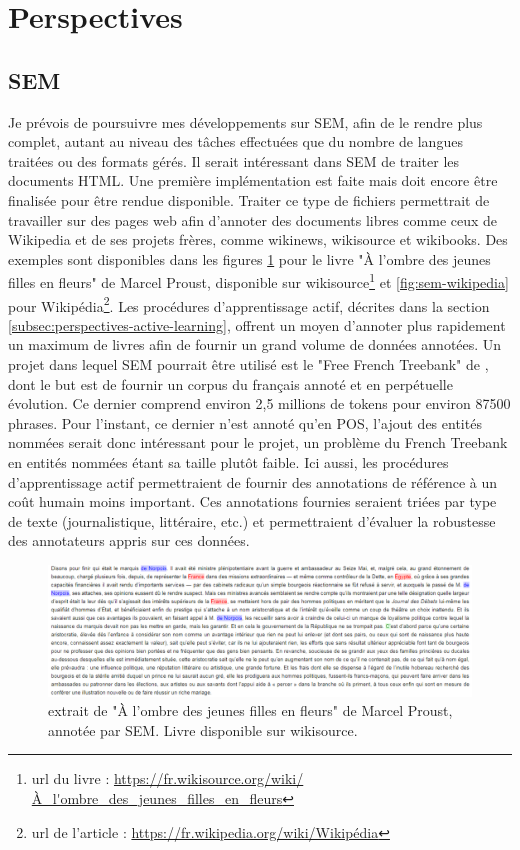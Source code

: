 \documentclass[12pt,a4paper,times,twoside,openright]{report}
\begin{document}
\section{Perspectives}
    
    \subsection{SEM}
    \label{subsec:perspectives-SEM}
Je prévois de poursuivre mes développements sur SEM, afin de le rendre plus complet, autant au niveau des tâches effectuées que du nombre de langues traitées ou des formats gérés. Il serait intéressant dans SEM de traiter les documents HTML. Une première implémentation est faite mais doit encore être finalisée pour être rendue disponible. Traiter ce type de fichiers permettrait de travailler sur des pages web afin d'annoter des documents libres comme ceux de Wikipedia et de ses projets frères, comme wikinews, wikisource et wikibooks. Des exemples sont disponibles dans les figures \ref{fig:sem-wikisource} pour le livre "À l'ombre des jeunes filles en fleurs" de Marcel Proust, disponible sur wikisource\footnote{url du livre : \url{https://fr.wikisource.org/wiki/À_l'ombre_des_jeunes_filles_en_fleurs}} et \ref{fig:sem-wikipedia} pour Wikipédia\footnote{url de l'article : \url{https://fr.wikipedia.org/wiki/Wikipédia}}. Les procédures d'apprentissage actif, décrites dans la section \ref{subsec:perspectives-active-learning}, offrent un moyen d'annoter plus rapidement un maximum de livres afin de fournir un grand volume de données annotées. Un projet dans lequel SEM pourrait être utilisé est le "Free French Treebank" de \citet{hernandez2013construction}, dont le but est de fournir un corpus du français annoté et en perpétuelle évolution. Ce dernier comprend environ 2,5 millions de tokens pour environ 87500 phrases. Pour l'instant, ce dernier n'est annoté qu'en POS, l'ajout des entités nommées serait donc intéressant pour le projet, un problème du French Treebank en entités nommées étant sa taille plutôt faible. Ici aussi, les procédures d'apprentissage actif permettraient de fournir des annotations de référence à un coût humain moins important. Ces annotations fournies seraient triées par type de texte (journalistique, littéraire, etc.) et permettraient d'évaluer la robustesse des annotateurs appris sur ces données.

\begin{figure}[ht!]
\centering
\includegraphics[scale=0.5]{images/SEM/futur-sem-wikisource}
\caption{extrait de "À l'ombre des jeunes filles en fleurs" de Marcel Proust, annotée par SEM. Livre disponible sur wikisource.}
\label{fig:sem-wikisource}
\end{figure}
\end{document}
